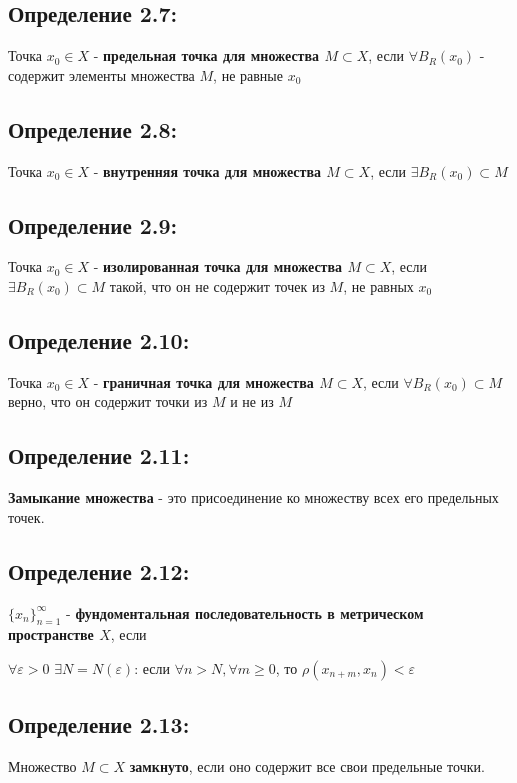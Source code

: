\documentclass[12pt]{article}
\begin{document}
\subsection*{Определение 2.7:}
	 Точка $x_0 \in X$ - \textbf{предельная точка для множества $M \subset X$}, если $\forall B_R (x_0)$ - содержит элементы множества $M$,
	 не равные $x_0$
	
\subsection*{Определение 2.8:}
	 Точка $x_0 \in X$ - \textbf{внутренняя точка для множества $M \subset X$}, если $\exists B_R (x_0) \subset M$
	
\subsection*{Определение 2.9:}
	 Точка $x_0 \in X$ - \textbf{изолированная точка для множества $M \subset X$}, если $\exists B_R (x_0) \subset M$ такой, что
	 он не содержит точек из $M$, не равных $x_0$

\subsection*{Определение 2.10:}
	 Точка $x_0 \in X$ - \textbf{граничная точка для множества $M \subset X$}, если $\forall B_R (x_0) \subset M$ 
	 верно, что он содержит точки из $M$ и не из $M$

\subsection*{Определение 2.11:}
	 \textbf{Замыкание множества} - это присоединение ко множеству всех его предельных точек.

\subsection*{Определение 2.12:}
	 $\{{x_n}\}_{n = 1}^{\infty}$ - \textbf{фундоментальная последовательность в метрическом пространстве $X$}, если
	 
	 $\forall \varepsilon > 0$ $ \exists N = N(\varepsilon)$: 
	 если $\forall n > N, \forall m \ge 0$, то 
	 $\rho(x_{n+m}, x_n) < \varepsilon$
	 
\subsection*{Определение 2.13:} \label{eq101}
	 Множество $M \subset X$ \textbf{замкнуто}, если оно содержит все свои предельные точки.
\end{document}
